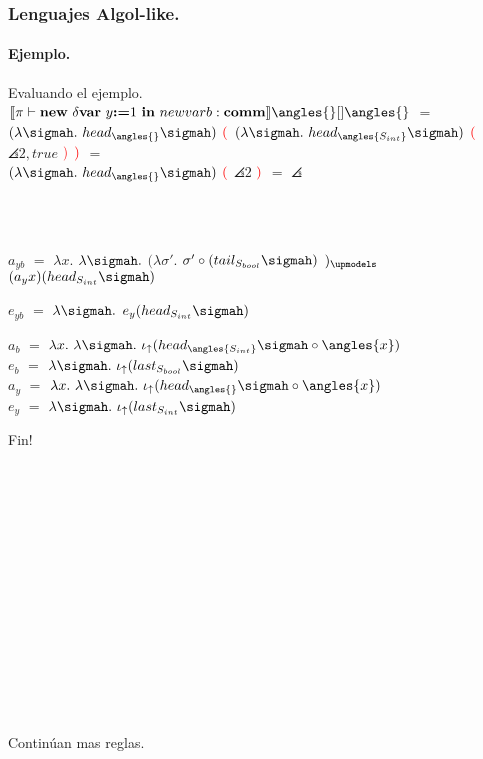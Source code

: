 \documentclass{beamer} %
\begin{document}
\begin{frame}
\frametitle{Lenguajes Algol-like.}
\framesubtitle{Ejemplo.}

\begin{block}{Evaluando el ejemplo.}
$\denotalsem{\pi}{\newdeltavar{y}{1}{newvarb}:\comm}{\angles{}}{[]}{\angles{}}$ $=$
$(\lambda \sigmah . \ head_{\angles{}}\sigmah)$ $\textcolor{red}{(}$ $(\lambda \sigmah . \ head_{\angles{S_{int}}} \sigmah)$ $\textcolor{red}{(}$ \pause $\angles{2, true}$
$\textcolor{red}{)}$ $\textcolor{red}{)}$ $=$\\ \pause
$(\lambda \sigmah . \ head_{\angles{}}\sigmah)$ $\textcolor{red}{(}$ $\angles{2}$ $\textcolor{red}{)}$ $=$ \pause $\angles{}$\\

\

\


$a_{yb}$ $=$ $\lambda x.$ $\lambda \sigmah .$ $(\lambda \sigma' .$ $\sigma' \circ (tail_{S_{bool}}\sigmah)$ $)_{\upmodels}$ $(a_y x)(head_{S_{int}}\sigmah)$

$e_{yb}$ $=$ $\lambda \sigmah .$ $e_y(head_{S_{int}}\sigmah)$

$a_b$ $=$ $\lambda x. \ \lambda \sigmah . \ \iotabot(head_{\angles{S_{int}}}\sigmah \circ \angles{x})$\\
$e_b$ $=$ $\lambda \sigmah . \ \iotabot(last_{S_{bool}}\sigmah)$\\

$a_y$ $=$ $\lambda x. \ \lambda \sigmah . \ \iotabot(head_{\angles{}}\sigmah \circ \angles{x})$\\
$e_y$ $=$ $\lambda \sigmah . \ \iotabot(last_{S_{int}}\sigmah)$
\end{block}

\end{frame}

\begin{frame}
\begin{center}\Huge
Fin!
\end{center}
\

\

\

\

\

\

\

\

{\tiny Contin\'uan mas reglas.}
\end{frame}
\end{document}
